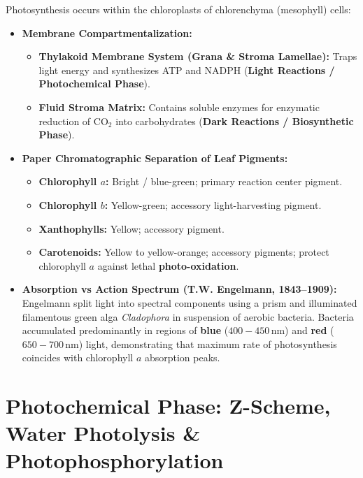 \documentclass[10pt,twoside,openright]{book}
\begin{document}
\begin{conceptbox}
Photosynthesis occurs within the chloroplasts of chlorenchyma (mesophyll) cells:
\begin{itemize}[leftmargin=*]
  \item \textbf{Membrane Compartmentalization:}
  \begin{itemize}
    \item \textbf{Thylakoid Membrane System (Grana \& Stroma Lamellae):} Traps light energy and synthesizes ATP and NADPH (\textbf{Light Reactions / Photochemical Phase}).
    \item \textbf{Fluid Stroma Matrix:} Contains soluble enzymes for enzymatic reduction of $\mathrm{CO}_2$ into carbohydrates (\textbf{Dark Reactions / Biosynthetic Phase}).
  \end{itemize}
  \item \textbf{Paper Chromatographic Separation of Leaf Pigments:}
  \begin{itemize}
    \item \textbf{Chlorophyll $a$:} Bright / blue-green; primary reaction center pigment.
    \item \textbf{Chlorophyll $b$:} Yellow-green; accessory light-harvesting pigment.
    \item \textbf{Xanthophylls:} Yellow; accessory pigment.
    \item \textbf{Carotenoids:} Yellow to yellow-orange; accessory pigments; protect chlorophyll $a$ against lethal \textbf{photo-oxidation}.
  \end{itemize}
  \item \textbf{Absorption vs Action Spectrum (T.W. Engelmann, 1843--1909):}
  Engelmann split light into spectral components using a prism and illuminated filamentous green alga \textit{Cladophora} in suspension of aerobic bacteria. Bacteria accumulated predominantly in regions of \textbf{blue} ($400-450\,\mathrm{nm}$) and \textbf{red} ($650-700\,\mathrm{nm}$) light, demonstrating that maximum rate of photosynthesis coincides with chlorophyll $a$ absorption peaks.
\end{itemize}
\end{conceptbox}

\section{Photochemical Phase: Z-Scheme, Water Photolysis \& Photophosphorylation}
\end{document}
